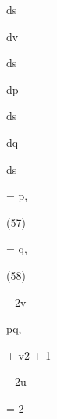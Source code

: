 \documentclass[a4paper,portrait,12pt]{article}
\begin{document}
\begin{flushleft}
ds
\end{flushleft}


\begin{flushleft}
dv
\end{flushleft}


\begin{flushleft}
ds
\end{flushleft}


\begin{flushleft}
dp
\end{flushleft}


\begin{flushleft}
ds
\end{flushleft}


\begin{flushleft}
dq
\end{flushleft}


\begin{flushleft}
ds
\end{flushleft}





\begin{flushleft}
= p,
\end{flushleft}





(57)





\begin{flushleft}
= q,
\end{flushleft}





(58)





\begin{flushleft}
$-$2v
\end{flushleft}


\begin{flushleft}
pq,
\end{flushleft}


\begin{flushleft}
+ v2 + 1
\end{flushleft}


\begin{flushleft}
$-$2u
\end{flushleft}


= 2
\end{document}

